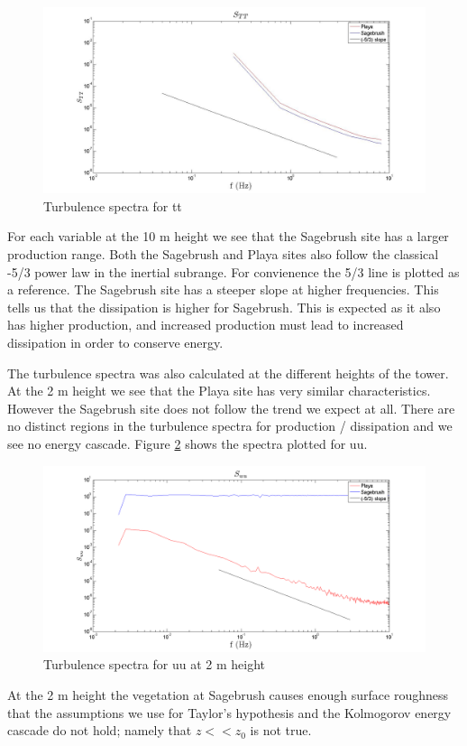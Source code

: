 \documentclass[]{article}
\begin{document}
\begin{figure}[h]
	\centering
	\includegraphics[width=\textwidth]{S_tt10m.jpg}
	\caption{Turbulence spectra for tt}
	\label{fig:S_tt10m}
\end{figure}

For each variable at the 10 m height we see that the Sagebrush site has a larger production range. Both the Sagebrush and Playa sites also follow the classical -5/3 power law in the inertial subrange. For convienence the 5/3 line is plotted as a reference. The Sagebrush site has a steeper slope at higher frequencies. This tells us that the dissipation is higher for Sagebrush. This is expected as it also has higher production, and increased production must lead to increased dissipation in order to conserve energy.

The turbulence spectra was also calculated at the different heights of the tower. At the 2 m height we see that the Playa site has very similar characteristics.  However the Sagebrush site does not follow the trend we expect at all. There are no distinct regions in the turbulence spectra for production / dissipation and we see no energy cascade. Figure \ref{fig:S_uu} shows the spectra plotted for uu.
\begin{figure}[h]
	\centering
	\includegraphics[width=\textwidth]{S_uu.png}
	\caption{Turbulence spectra for uu at 2 m height}
	\label{fig:S_uu}
\end{figure}
At the 2 m height the vegetation at Sagebrush causes enough surface roughness that the assumptions we use for Taylor's hypothesis and the Kolmogorov energy cascade do not hold; namely that $z << z_0$ is not true. 
\end{document}
